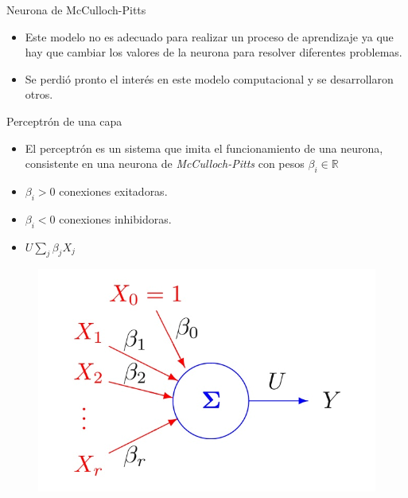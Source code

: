 \documentclass[spanish]{beamer}
\begin{document}
\begin{frame}{Neurona de McCulloch-Pitts}
  \begin{itemize}
    \item Este modelo no es adecuado para realizar un proceso de aprendizaje ya que hay que cambiar los valores de la neurona para resolver diferentes problemas.
    \item Se perdió pronto el interés en este modelo computacional y se desarrollaron otros.
  \end{itemize}
\end{frame}

\begin{frame}{Perceptrón de una capa}
  \begin{itemize}
    \item El perceptrón es un sistema que imita el funcionamiento de una neurona, consistente en una neurona de \textit{McCulloch-Pitts} con pesos $\beta_i \in \mathbb{R}$
    \item $\beta_i > 0$ conexiones exitadoras.
    \item $\beta_i < 0$ conexiones inhibidoras.
    \item $U \sum_j \beta_j X_j$
  \end{itemize}
  \begin{figure}[h]
    \centering
    \includegraphics[width=.7\textwidth]{img/perceptron}
  \end{figure}
\end{frame}
\end{document}
